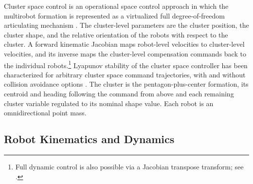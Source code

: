 \documentclass[lettersize,journal]{IEEEtran}
\begin{document}
Cluster space control is an operational space control approach in
which the multirobot formation is represented as a virtualized full
degree-of-freedom articulating mechanism \cite{31}. The cluster-level
parameters are the cluster position, the cluster shape, and the
relative orientation of the robots with respect to the cluster. A
forward kinematic Jacobian maps robot-level velocities to cluster-level
velocities, and its inverse maps the cluster-level compensation
commands back to the individual robots.\footnote{Full dynamic control
is also possible via a Jacobian transpose transform; see \cite{31}.}
Lyapunov stability of the cluster space controller has been
characterized for arbitrary cluster space command trajectories, with
and without collision avoidance options \cite{32}. The cluster is the
pentagon-plus-center formation, its centroid
and heading following the command from above and each remaining cluster
variable regulated to its nominal shape value. Each robot is an
omnidirectional point mass.

\subsection{Robot Kinematics and Dynamics}
\label{sec:robot_model}
\end{document}
